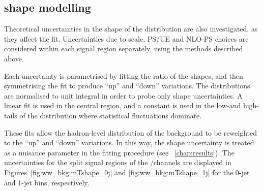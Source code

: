 \subsection{\mt shape modelling}
\label{sec:ww_bkg:mt}

Theoretical uncertainties in the shape of the \mt distribution are also investigated, 
as they affect the fit. Uncertainties due to scale, PS/UE and NLO-PS choices are 
considered within each signal region separately, using the methods described above.

Each uncertainty is parametrised by fitting the ratio of the \mt shapes, and then 
symmetrising the fit to produce ``up'' and ``down'' variations. The \mt distributions are 
normalised to unit integral in order to probe only shape uncertainties. A linear 
fit is used in the central \mt region, and a constant is used in the low-\mt and 
high-\mt tails of the distribution where statistical fluctuations dominate.

These fits allow the hadron-level \mt distribution of the \WW background to be reweighted 
to the ``up'' and ``down'' variations. In this way, the \mt shape uncertainty is treated 
as a nuisance parameter in the \HWW fitting procedure (see \Chapter~\ref{chap:results}). 
The uncertainties for the split signal regions of the \emch/\mech channels are displayed in 
Figures~\ref{fig:ww_bkg:mTshape_0j} and \ref{fig:ww_bkg:mTshape_1j} for the 0-jet and 1-jet 
bins, respectively.

